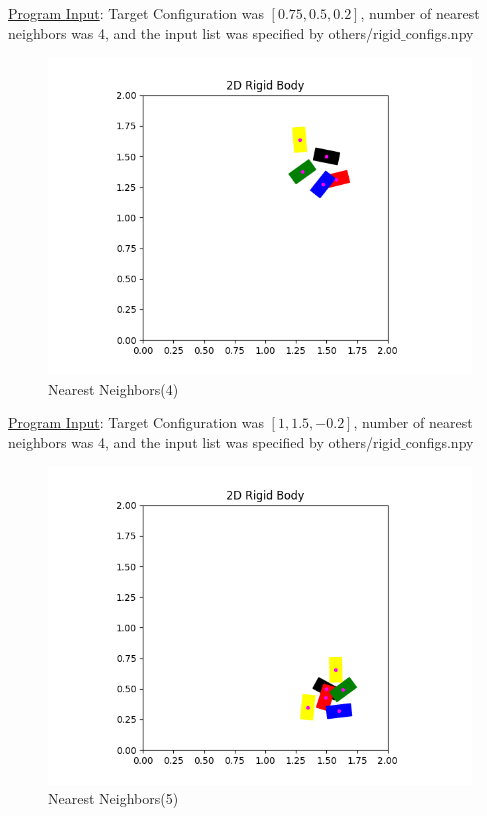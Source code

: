 \documentclass{article}
\begin{document}
\underline{Program Input}: Target Configuration was $[0.75, 0.5, 0.2]$, number of nearest neighbors was 4, and the input list was specified by others/rigid$\_$configs.npy

\newpage 
\begin{figure}[h!]
	\includegraphics[width= 0.9 \linewidth]{P2_NearestNeighbor(4).png}
	\centering
	\caption{Nearest Neighbors(4)}
	\label{P2_NearestNeighbor(4).png}
\end{figure}

\underline{Program Input}: Target Configuration was $[1, 1.5, -0.2]$, number of nearest neighbors was 4, and the input list was specified by others/rigid$\_$configs.npy

\newpage
\begin{figure}[h!]
	\includegraphics[width= 0.9 \linewidth]{P2_NearestNeighbor(5).png}
	\centering
	\caption{Nearest Neighbors(5)}
	\label{P2_NearestNeighbor(5).png}
\end{figure}
\end{document}
